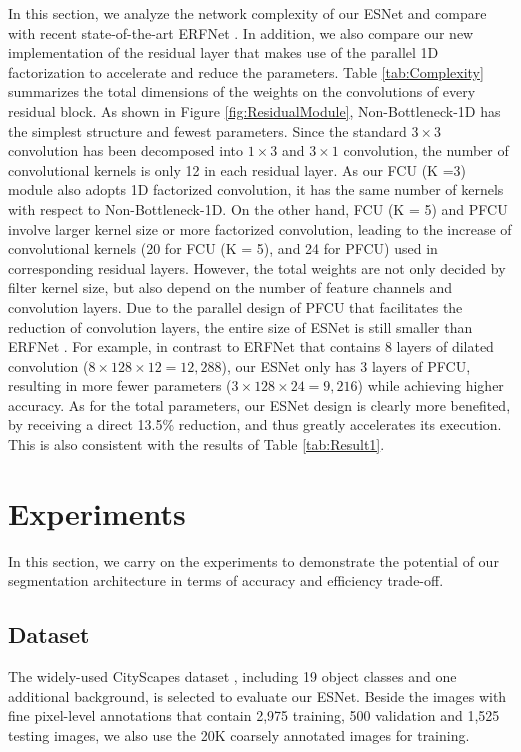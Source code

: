 \documentclass[runningheads]{llncs}
\begin{document}
In this section, we analyze the network complexity of our ESNet and compare with recent state-of-the-art ERFNet \cite{Romera2018erfnet}. In addition, we also compare our new implementation of the residual layer that makes use of the parallel 1D factorization to accelerate and reduce the parameters. Table \ref{tab:Complexity} summarizes the total dimensions of the weights on the convolutions of every residual block. As shown in Figure \ref{fig:ResidualModule}, Non-Bottleneck-1D has the simplest structure and fewest parameters. Since the standard $3 \times 3$ convolution has been decomposed into $1 \times 3$ and $3 \times 1$ convolution, the number of convolutional kernels is only 12 in each residual layer. As our FCU (K =3) module also adopts 1D factorized convolution, it has the same number of kernels with respect to Non-Bottleneck-1D. On the other hand, FCU (K = 5) and PFCU involve larger kernel size or more factorized convolution, leading to the increase of convolutional kernels (20 for FCU (K = 5), and 24 for PFCU) used in corresponding residual layers. However, the total weights are not only decided by filter kernel size, but also depend on the number of feature channels and convolution layers. Due to the parallel design of PFCU that facilitates the reduction of convolution layers, the entire size of ESNet is still smaller than ERFNet \cite{Romera2018erfnet}. For example, in contrast to ERFNet \cite{Romera2018erfnet} that contains 8 layers of dilated convolution ($8 \times 128 \times 12 = 12,288$), our ESNet only has 3 layers of PFCU, resulting in more fewer parameters ($3 \times 128 \times 24 = 9,216$) while achieving higher accuracy. As for the total parameters, our ESNet design is clearly more benefited, by receiving a direct 13.5\% reduction, and thus greatly accelerates its execution. This is also consistent with the results of Table \ref{tab:Result1}.

\section{Experiments}\label{sec:Experiments}

In this section, we carry on the experiments to demonstrate the potential of our segmentation architecture in terms of accuracy and efficiency trade-off.

\subsection{Dataset}

The widely-used CityScapes dataset \cite{Cordts2016the}, including 19 object classes and one additional background, is selected to evaluate our ESNet. Beside the images with fine pixel-level annotations that contain 2,975 training, 500 validation and 1,525 testing images, we also use the 20K coarsely annotated images for training.
\end{document}
